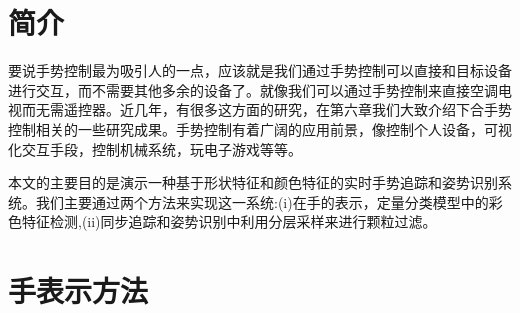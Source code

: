 \documentclass{XDBAthesis}
\begin{document}
\else
\fi
\chapter{简介}
要说手势控制最为吸引人的一点，应该就是我们通过手势控制可以直接和目标设备进行交互，而不需要其他多余的设备了。就像我们可以通过手势控制来直接空调电视而无需遥控器。近几年，有很多这方面的研究，在第六章我们大致介绍下合手势控制相关的一些研究成果。手势控制有着广阔的应用前景，像控制个人设备，可视化交互手段，控制机械系统，玩电子游戏等等。

本文的主要目的是演示一种基于形状特征和颜色特征的实时手势追踪和姿势识别系统。我们主要通过两个方法来实现这一系统:(i)在手的表示，定量分类模型中的彩色特征检测,(ii)同步追踪和姿势识别中利用分层采样来进行颗粒过滤。

\chapter{手表示方法}



\ifx\allfiles\undefined
%
%
\end{document}
